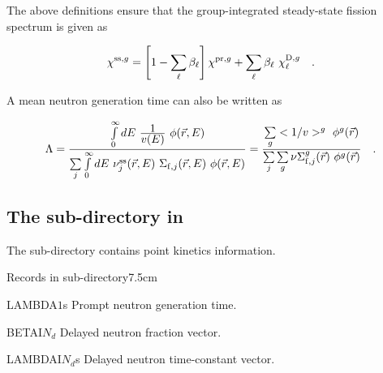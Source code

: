 \vskip 0.2cm

The above definitions ensure that the group-integrated steady-state fission spectrum is given as

\begin{equation}
\chi^{{\rm ss},g} = \left[1-\sum_\ell\beta_\ell\right] \chi^{{\rm pr},g}+\sum_\ell \beta_\ell \ \chi_\ell^{{\rm D},g} \ \ \ .
\end{equation}

\vskip 0.2cm

A mean neutron generation time can also be written as

\begin{equation}
\Lambda={\int\limits_0^\infty dE \ {\displaystyle 1 \over \displaystyle v(E)} \ \phi(\vec r,E) \over
\sum\limits_j{\int\limits_0^\infty dE \
\nu_j^{\rm ss}(\vec r,E)\ \Sigma_{{\rm f},j}(\vec r,E) \ \phi(\vec r,E)}}={\sum\limits_g <1/v>^g \ \phi^g(\vec r) \over
\sum\limits_j{\sum\limits_g \nu\Sigma_{{\rm f},j}^g(\vec r) \ \phi^g(\vec r)}} \ \ \ .
\end{equation}

\subsection{The  sub-directory in }\label{sect:macroPKIN}

The  sub-directory contains point kinetics information.

\vskip 0.08cm

\begin{DescriptionEnregistrement}{Records in  sub-directory}{7.5cm}

\RealEnr
 {LAMBDA}{$1$}{s} {Prompt neutron generation time.}

\RealEnr
 {BETAI}{$N_{d}$}{} {Delayed neutron fraction vector.}

\RealEnr
 {LAMBDAI}{$N_{d}$}{s} {Delayed neutron time-constant vector.}

\end{DescriptionEnregistrement}


\eject
